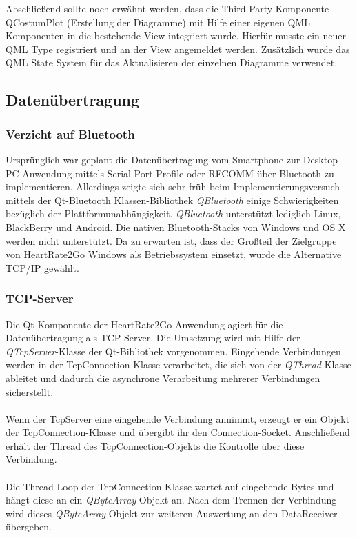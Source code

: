 Abschließend sollte noch erwähnt werden, dass die Third-Party Komponente QCostumPlot (Erstellung der Diagramme) mit Hilfe einer eigenen QML Komponenten in die bestehende View integriert wurde. Hierfür musste ein neuer QML Type registriert und an der View angemeldet werden. Zusätzlich wurde das QML State System für das Aktualisieren der einzelnen Diagramme verwendet.

\subsection{Datenübertragung}
\subsubsection{Verzicht auf Bluetooth}
Ursprünglich war geplant die Datenübertragung vom Smartphone zur Desktop-PC-Anwendung mittels Serial-Port-Profile oder RFCOMM über Bluetooth zu implementieren. Allerdings zeigte sich sehr früh beim Implementierungsversuch mittels der Qt-Bluetooth Klassen-Bibliothek \textit{QBluetooth} einige Schwierigkeiten bezüglich der Plattformunabhängigkeit. \textit{QBluetooth} unterstützt lediglich Linux, BlackBerry und Android\cite{qtbluetooth}. Die nativen Bluetooth-Stacks von Windows und OS X werden nicht unterstützt. Da zu erwarten ist, dass der Großteil der Zielgruppe von HeartRate2Go Windows als Betriebssystem einsetzt, wurde die Alternative TCP/IP gewählt.

\subsubsection{TCP-Server}
Die Qt-Komponente der HeartRate2Go Anwendung agiert für die Datenübertragung als TCP-Server. Die Umsetzung wird mit Hilfe der \textit{QTcpServer}-Klasse der Qt-Bibliothek vorgenommen\cite{qtcpserver}. Eingehende Verbindungen werden in der TcpConnection-Klasse verarbeitet, die sich von der \textit{QThread}-Klasse ableitet und dadurch die asynchrone Verarbeitung mehrerer Verbindungen sicherstellt.\\
\\
Wenn der TcpServer eine eingehende Verbindung annimmt, erzeugt er ein Objekt der TcpConnection-Klasse und übergibt ihr den Connection-Socket. Anschließend erhält der Thread des TcpConnection-Objekts die Kontrolle über diese Verbindung.\\
\\
Die Thread-Loop der TcpConnection-Klasse wartet auf eingehende Bytes und hängt diese an ein \textit{QByteArray}-Objekt an. Nach dem Trennen der Verbindung wird dieses \textit{QByteArray}-Objekt zur weiteren Auswertung an den DataReceiver übergeben.

